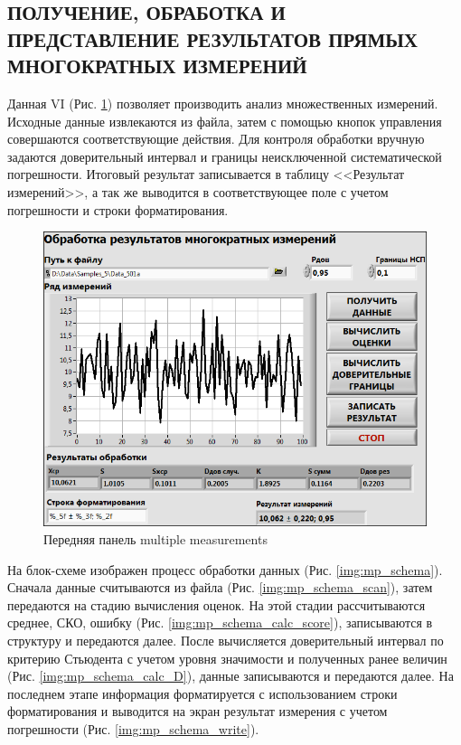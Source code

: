 \documentclass[a4paper,14pt]{article}
\begin{document}
\subsection{ПОЛУЧЕНИЕ, ОБРАБОТКА И ПРЕДСТАВЛЕНИЕ РЕЗУЛЬТАТОВ ПРЯМЫХ МНОГОКРАТНЫХ ИЗМЕРЕНИЙ}

Данная VI (Рис. \ref{img:mp_vi}) позволяет производить анализ множественных измерений.
Исходные данные извлекаются из файла, затем с помощью кнопок управления совершаются соответствующие действия.
Для контроля обработки вручную задаются доверительный интервал и границы неисключенной систематической погрешности.
Итоговый результат записывается в таблицу <<Результат измерений>>, а так же выводится в соответствующее поле с учетом погрешности и строки форматирования.

\begin{figure}[H]
    \centering
    \includegraphics[width=\linewidth]{image/mp_vi}
    \caption{Передняя панель multiple measurements}\label{img:mp_vi}
\end{figure}

На блок-схеме изображен процесс обработки данных (Рис. \ref{img:mp_schema}).
Сначала данные считываются из файла  (Рис. \ref{img:mp_schema_scan}), затем передаются на стадию вычисления оценок.
На этой стадии рассчитываются среднее, СКО,  ошибку  (Рис. \ref{img:mp_schema_calc_score}), записываются в структуру и передаются далее.
После вычисляется доверительный интервал по критерию Стьюдента с учетом уровня значимости и полученных ранее величин (Рис. \ref{img:mp_schema_calc_D}), данные записываются и передаются далее.
На последнем этапе информация форматируется с использованием строки форматирования и выводится на экран результат измерения с учетом погрешности  (Рис. \ref{img:mp_schema_write}).
\end{document}
